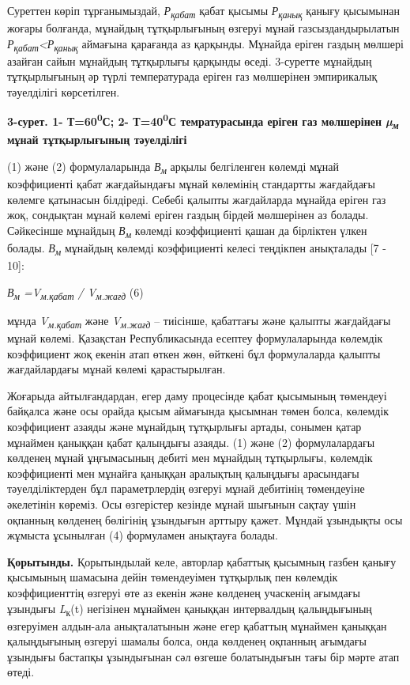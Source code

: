 Суреттен көріп тұрғанымыздай, \emph{Р\textsubscript{қабат}} қабат қысымы
\emph{Р\textsubscript{қанық}} қанығу қысымынан жоғары болғанда, мұнайдың
тұтқырлығының өзгеруі мұнай газсыздандырылатын
\emph{Р\textsubscript{қабат}\textless Р\textsubscript{қанық}} аймағына
қарағанда аз қарқынды. Мұнайда еріген газдың мөлшері азайған сайын
мұнайдың тұтқырлығы қарқынды өседі. 3-суретте мұнайдың тұтқырлығының әр
түрлі температурада еріген газ мөлшерінен эмпирикалық тәуелділігі
көрсетілген.

{\bfseries 3-сурет. 1- Т=60\textsuperscript{0}С; 2-
Т=40\textsuperscript{0}С темратурасында еріген газ мөлшерінен
\emph{µ\textsubscript{м}} мұнай тұтқырлығының тәуелділігі}

(1) және (2) формулаларында \emph{В\textsubscript{м}} арқылы белгіленген
көлемді мұнай коэффициенті қабат жағдайындағы мұнай көлемінің стандартты
жағдайдағы көлемге қатынасын білдіреді. Себебі қалыпты жағдайларда
мұнайда еріген газ жоқ, сондықтан мұнай көлемі еріген газдың бірдей
мөлшерінен аз болады. Сәйкесінше мұнайдың \emph{В\textsubscript{м}}
көлемді коэффициенті қашан да бірліктен үлкен болады.
\emph{В\textsubscript{м}} мұнайдың көлемді коэффициенті келесі теңдікпен
анықталады {[}7 - 10{]}:

\emph{В\textsubscript{м} =V\textsubscript{м.қабат} /
V\textsubscript{м.жағд}} (6)

мұнда \emph{V\textsubscript{м.қабат}} және
\emph{V\textsubscript{м.жағд}} -- тиісінше, қабаттағы және қалыпты
жағдайдағы мұнай көлемі. Қазақстан Республикасында есептеу
формулаларында көлемдік коэффициент жоқ екенін атап өткен жөн, өйткені
бұл формулаларда қалыпты жағдайлардағы мұнай көлемі қарастырылған.

Жоғарыда айтылғандардан, егер даму процесінде қабат қысымының төмендеуі
байқалса және осы орайда қысым аймағында қысымнан төмен болса, көлемдік
коэффициент азаяды және мұнайдың тұтқырлығы артады, сонымен қатар
мұнаймен қаныққан қабат қалыңдығы азаяды. (1) және (2) формулалардағы
көлденең мұнай ұңғымасының дебиті мен мұнайдың тұтқырлығы, көлемдік
коэффициенті мен мұнайға қаныққан аралықтың қалыңдығы арасындағы
тәуелділіктерден бұл параметрлердің өзгеруі мұнай дебитінің төмендеуіне
әкелетінін көреміз. Осы өзгерістер кезінде мұнай шығынын сақтау үшін
оқпанның көлденең бөлігінің ұзындығын арттыру қажет. Мұндай ұзындықты
осы жұмыста ұсынылған (4) формуламен анықтауға болады.

{\bfseries Қорытынды.} Қорытындылай келе, авторлар қабаттық қысымның газбен
қанығу қысымының шамасына дейін төмендеуімен тұтқырлық пен көлемдік
коэффициенттің өзгеруі өте аз екенін және көлденең учаскенің ағымдағы
ұзындығы \emph{L}\textsubscript{к}(t) негізінен мұнаймен қаныққан
интервалдың қалыңдығының өзгеруімен алдын-ала анықталатынын және егер
қабаттың мұнаймен қаныққан қалыңдығының өзгеруі шамалы болса, онда
көлденең оқпанның ағымдағы ұзындығы бастапқы ұзындығынан сәл өзгеше
болатындығын тағы бір мәрте атап өтеді.

